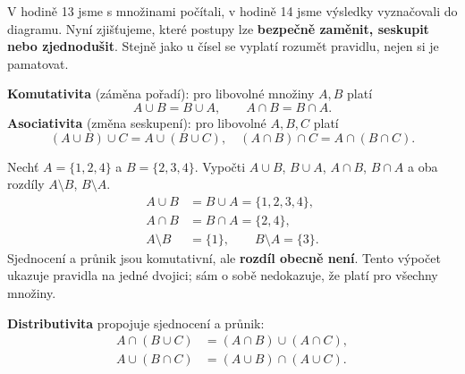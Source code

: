 \documentclass[11pt,a4paper]{article}
\begin{document}
V hodině 13 jsme s množinami počítali, v hodině 14 jsme výsledky
vyznačovali do diagramu. Nyní zjišťujeme, které postupy lze
\textbf{bezpečně zaměnit, seskupit nebo zjednodušit}.
Stejně jako u čísel se vyplatí rozumět pravidlu, nejen si je pamatovat.


\begin{vlastnostBox}[title={Věta - Komutativita a asociativita množin}]
\textbf{Komutativita} (záměna pořadí): pro libovolné množiny $A,B$ platí
\[
A\cup B=B\cup A,\qquad A\cap B=B\cap A.
\]
\textbf{Asociativita} (změna seskupení): pro libovolné $A,B,C$ platí
\[
(A\cup B)\cup C=A\cup(B\cup C),\quad
(A\cap B)\cap C=A\cap(B\cap C).
\]
\end{vlastnostBox}

\begin{prikladReseniBox}[title={Příklad 1}]
Nechť $A=\{1,2,4\}$ a $B=\{2,3,4\}$.
Vypočti $A\cup B$, $B\cup A$, $A\cap B$, $B\cap A$
a oba rozdíly $A\setminus B$, $B\setminus A$.
\tcblower
\begin{align*}
A\cup B&=B\cup A=\{1,2,3,4\},\\[-2pt]
A\cap B&=B\cap A=\{2,4\},\\[-2pt]
A\setminus B&=\{1\},\qquad B\setminus A=\{3\}.
\end{align*}
Sjednocení a průnik jsou komutativní, ale \textbf{rozdíl obecně není}.
Tento výpočet ukazuje pravidla na jedné dvojici; sám o sobě nedokazuje,
že platí pro všechny množiny.
\end{prikladReseniBox}


\begin{vlastnostBox}[title={Věta - Distributivita množinových operací}]
\textbf{Distributivita} propojuje sjednocení a průnik:
\[
\begin{aligned}
A\cap(B\cup C)&=(A\cap B)\cup(A\cap C),\\
A\cup(B\cap C)&=(A\cup B)\cap(A\cup C).
\end{aligned}
\]
\end{vlastnostBox}
\end{document}
